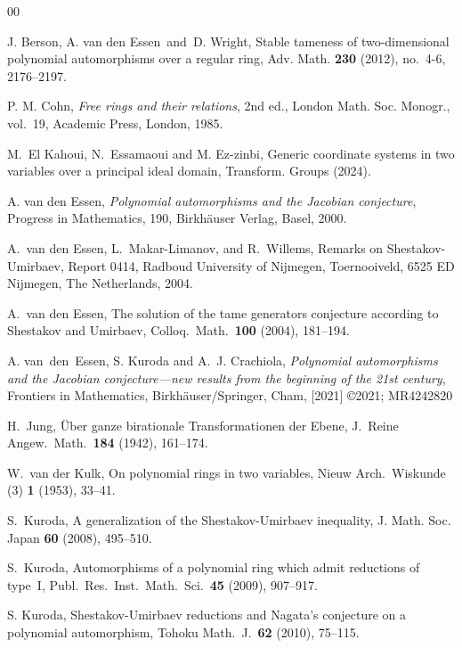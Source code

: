 \documentclass{amsart}
\theoremstyle{plain}
\theoremstyle{definition}
\begin{document}
\begin{thebibliography}{00}



J. Berson, A. van den Essen\ and\ D. Wright, 
Stable tameness of two-dimensional polynomial automorphisms 
over a regular ring, Adv. Math. {\bf 230} (2012), no.~4-6, 2176--2197.



P. M. Cohn, 
{\it 
Free rings and their relations}, 
2nd ed., London Math. Soc. Monogr., vol.\ 19,
Academic Press, London, 1985.

M.\ El Kahoui, 
N.\ Essamaoui 
and M. Ez-zinbi, 
Generic coordinate systems in two variables over a principal ideal domain, 
Transform. Groups (2024). 


A. van den Essen, 
{\it Polynomial automorphisms and the Jacobian conjecture}, 
Progress in Mathematics, 190, Birkh\"auser Verlag, Basel, 
2000. 

A.~van den Essen, L.~Makar-Limanov, and R.~Willems, 
Remarks on Shestakov-Umirbaev, 
Report 0414, 
Radboud University of Nijmegen, Toernooiveld, 
6525 ED Nijmegen, 
The Netherlands, 2004.


A.~van den Essen, 
The solution of the tame generators conjecture according 
to Shestakov and Umirbaev, 
Colloq.\ Math.\ {\bf 100} (2004), 181--194.

A. van~den~Essen, S. Kuroda and A.~J. Crachiola, 
{\it Polynomial automorphisms and the 
Jacobian conjecture---new results from the beginning of the 21st century}, 
Frontiers in Mathematics, Birkh\"auser/Springer, Cham, [2021] \copyright 2021; MR4242820


H.~Jung, 
\"Uber ganze birationale Transformationen der Ebene, 
J.\ Reine Angew.\ Math.\ {\bf 184} (1942), 161--174. 


W.~van der Kulk, 
On polynomial rings in two variables, 
Nieuw Arch.\ Wiskunde (3) {\bf 1} (1953), 33--41. 



S.~Kuroda, 
A generalization of the Shestakov-Umirbaev inequality, 
J. Math. Soc. Japan {\bf 60} (2008), 495--510. 


S.~Kuroda, 
Automorphisms of a polynomial ring which admit reductions of type~I, 
Publ.\ Res.\ Inst.\ Math.\ Sci.\ {\bf 45} (2009), 907--917. 


S. Kuroda, 
Shestakov-Umirbaev reductions 
and Nagata's conjecture on a polynomial 
automorphism, Tohoku Math.\ J.\ {\bf 62} (2010), 75--115.



\end{thebibliography}
\end{document}

